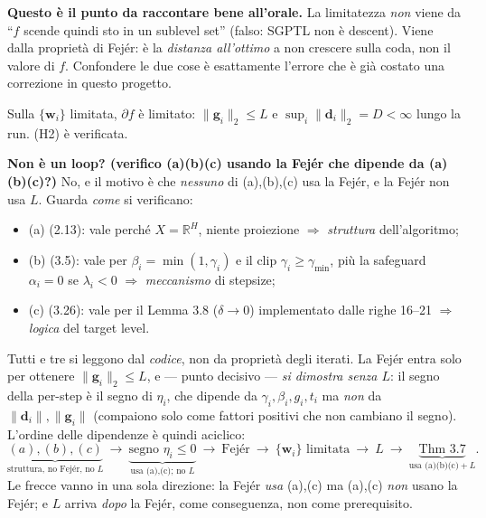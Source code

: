 \documentclass[11pt,a4paper]{article}
\theoremstyle{definition}
\newcommand{\w}{\bm{w}}
\newcommand{\g}{\bm{g}}
\newcommand{\dvec}{\bm{d}}
\newcommand{\gmin}{\gamma_{\min}}
\newcommand{\norm}[1]{\lVert #1\rVert}
\newcommand{\R}{\mathbb{R}}
\begin{document}
\begin{warnbox}
\textbf{Questo è il punto da raccontare bene all'orale.} La limitatezza \emph{non} viene da
``$f$ scende quindi sto in un sublevel set'' (falso: SGPTL non è descent). Viene dalla
proprietà di Fej\'er: è la \emph{distanza all'ottimo} a non crescere sulla coda, non il valore
di $f$. Confondere le due cose è esattamente l'errore che è già costato una correzione in
questo progetto.
\end{warnbox}

Sulla $\{\w_i\}$ limitata, $\partial f$ è limitato: $\norm{\g_i}_2\le L$ e
$\sup_i\norm{\dvec_i}_2=D<\infty$ lungo la run. (H2) è verificata.

\begin{warnbox}
\textbf{Non è un loop? (verifico (a)(b)(c) usando la Fej\'er che dipende da (a)(b)(c)?)}
No, e il motivo è che \emph{nessuno} di (a),(b),(c) usa la Fej\'er, e la Fej\'er non usa $L$.
Guarda \emph{come} si verificano:
\begin{itemize}[leftmargin=1.4em]
\item (a) (2.13): vale perché $X=\R^H$, niente proiezione $\Rightarrow$ \emph{struttura}
dell'algoritmo;
\item (b) (3.5): vale per $\beta_i=\min(1,\gamma_i)$ e il clip $\gamma_i\ge\gmin$, più la
safeguard $\alpha_i=0$ se $\lambda_i<0$ $\Rightarrow$ \emph{meccanismo} di stepsize;
\item (c) (3.26): vale per il Lemma 3.8 ($\delta\to0$) implementato dalle righe 16--21
$\Rightarrow$ \emph{logica} del target level.
\end{itemize}
Tutti e tre si leggono dal \emph{codice}, non da proprietà degli iterati. La Fej\'er entra solo
per ottenere $\norm{\g_i}_2\le L$, e --- punto decisivo --- \emph{si dimostra senza $L$}: il
segno della per-step è il segno di $\eta_i$, che dipende da $\gamma_i,\beta_i,g_i,t_i$ ma
\emph{non} da $\norm{\dvec_i},\norm{\g_i}$ (compaiono solo come fattori positivi che non
cambiano il segno). L'ordine delle dipendenze è quindi aciclico:
\[
\underbrace{(a),(b),(c)}_{\text{struttura, no Fej\'er, no }L}
\ \longrightarrow\
\underbrace{\text{segno }\eta_i\le0}_{\text{usa (a),(c); no }L}
\ \longrightarrow\
\text{Fej\'er}\ \longrightarrow\ \{\w_i\}\text{ limitata}\ \longrightarrow\ L\ \longrightarrow\
\underbrace{\text{Thm 3.7}}_{\text{usa (a)(b)(c)}+L}.
\]
Le frecce vanno in una sola direzione: la Fej\'er \emph{usa} (a),(c) ma (a),(c) \emph{non} usano
la Fej\'er; e $L$ arriva \emph{dopo} la Fej\'er, come conseguenza, non come prerequisito.
\end{warnbox}
\end{document}
